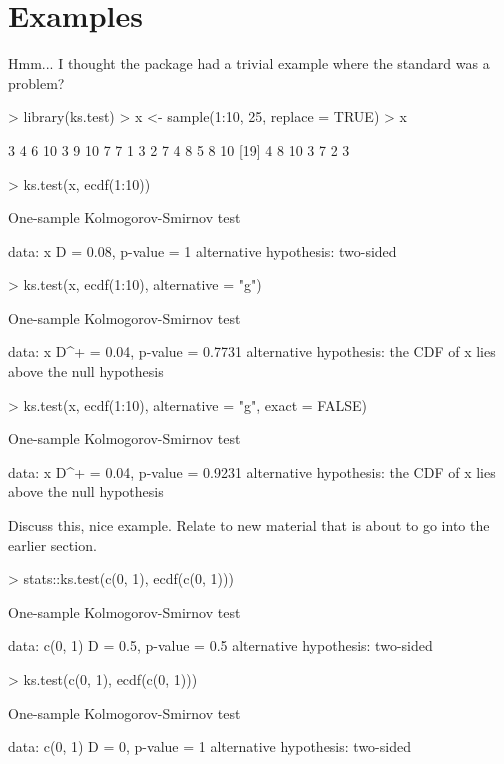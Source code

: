 \documentclass[article]{jss}
\begin{document}
 




\section{Examples}

Hmm... I thought the package had a trivial example where the standard
 was a problem?
\begin{Schunk}
\begin{Sinput}
> library(ks.test)
> x <- sample(1:10, 25, replace = TRUE)
> x
\end{Sinput}
\begin{Soutput}
 [1]  3  4  6 10  3  9 10  7  7  1  3  2  7  4  8  5  8 10
[19]  4  8 10  3  7  2  3
\end{Soutput}
\begin{Sinput}
> ks.test(x, ecdf(1:10))
\end{Sinput}
\begin{Soutput}
	One-sample Kolmogorov-Smirnov test

data:  x 
D = 0.08, p-value = 1
alternative hypothesis: two-sided 
\end{Soutput}
\begin{Sinput}
> ks.test(x, ecdf(1:10), alternative = "g")
\end{Sinput}
\begin{Soutput}
	One-sample Kolmogorov-Smirnov test

data:  x 
D^+ = 0.04, p-value = 0.7731
alternative hypothesis: the CDF of x lies above the null hypothesis 
\end{Soutput}
\begin{Sinput}
> ks.test(x, ecdf(1:10), alternative = "g", exact = FALSE)
\end{Sinput}
\begin{Soutput}
	One-sample Kolmogorov-Smirnov test

data:  x 
D^+ = 0.04, p-value = 0.9231
alternative hypothesis: the CDF of x lies above the null hypothesis 
\end{Soutput}
\end{Schunk}

Discuss this, nice example.  Relate to new material that is about to go into
the earlier section.
\begin{Schunk}
\begin{Sinput}
> stats::ks.test(c(0, 1), ecdf(c(0, 1)))
\end{Sinput}
\begin{Soutput}
	One-sample Kolmogorov-Smirnov test

data:  c(0, 1) 
D = 0.5, p-value = 0.5
alternative hypothesis: two-sided 
\end{Soutput}
\begin{Sinput}
> ks.test(c(0, 1), ecdf(c(0, 1)))
\end{Sinput}
\begin{Soutput}
	One-sample Kolmogorov-Smirnov test

data:  c(0, 1) 
D = 0, p-value = 1
alternative hypothesis: two-sided 
\end{Soutput}
\end{Schunk}
\end{document}
